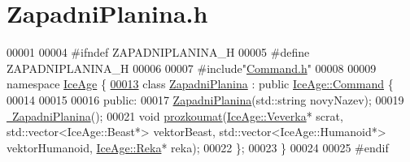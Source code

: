 \hypertarget{ZapadniPlanina_8h_source}{}\section{Zapadni\+Planina.\+h}
\label{ZapadniPlanina_8h_source}

\begin{DoxyCode}
00001 
00004 \textcolor{preprocessor}{#ifndef ZAPADNIPLANINA\_H}
00005 \textcolor{preprocessor}{#define ZAPADNIPLANINA\_H}
00006 
00007 \textcolor{preprocessor}{#include"\hyperlink{Command_8h}{Command.h}"}
00008 
00009 \textcolor{keyword}{namespace }\hyperlink{namespaceIceAge}{IceAge} \{
\hypertarget{ZapadniPlanina_8h_source.tex_l00013}{}\hyperlink{classIceAge_1_1ZapadniPlanina}{00013}     \textcolor{keyword}{class }\hyperlink{classIceAge_1_1ZapadniPlanina}{ZapadniPlanina} : \textcolor{keyword}{public} \hyperlink{classIceAge_1_1Command}{IceAge::Command} \{
00014 
00015 
00016     \textcolor{keyword}{public}:
00017         \hyperlink{classIceAge_1_1ZapadniPlanina_a00bed05e6c94978be3a6ab06097fb7f5}{ZapadniPlanina}(std::string novyNazev);
00019         \hyperlink{classIceAge_1_1ZapadniPlanina_a232195b066da4fa8eaa4e6524de6954d}{~ZapadniPlanina}();
00021         \textcolor{keywordtype}{void} \hyperlink{classIceAge_1_1ZapadniPlanina_a328d18a38647899a301125ac42ac9fd3}{prozkoumat}(\hyperlink{classIceAge_1_1Veverka}{IceAge::Veverka}* scrat, std::vector<IceAge::Beast*> 
      vektorBeast, std::vector<IceAge::Humanoid*> vektorHumanoid, \hyperlink{classIceAge_1_1Reka}{IceAge::Reka}* reka);
00022     \};
00023 \}
00024 
00025 \textcolor{preprocessor}{#endif}
\end{DoxyCode}
